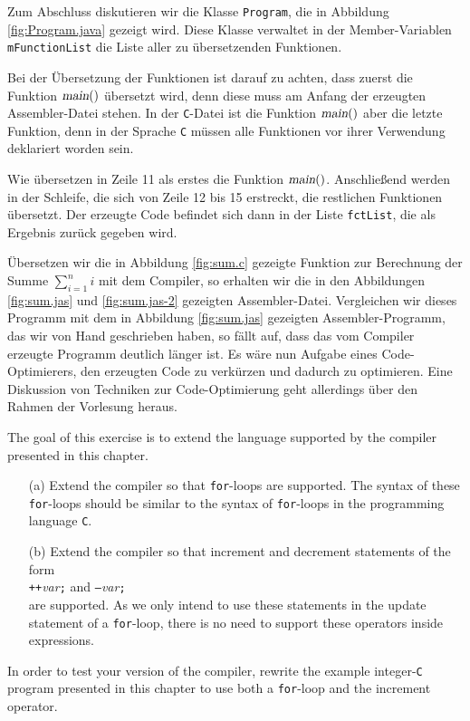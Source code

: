 \noindent
Zum Abschluss diskutieren wir die Klasse \texttt{Program}, die in Abbildung
\ref{fig:Program.java} gezeigt wird.  Diese Klasse verwaltet in der Member-Variablen
\texttt{mFunctionList} die Liste aller zu \"ubersetzenden Funktionen.  

Bei der \"Ubersetzung der Funktionen ist darauf zu achten, dass zuerst die Funktion $\textsl{main}()$
\"ubersetzt wird, denn diese muss am Anfang der erzeugten Assembler-Datei stehen.  In der
\texttt{C}-Datei ist die Funktion $\textsl{main}()$ aber die letzte Funktion, denn in der Sprache
\texttt{C} m\"ussen alle Funktionen vor ihrer Verwendung deklariert worden sein.

Wie \"ubersetzen in Zeile 11 als erstes die Funktion $\textsl{main}()$.  Anschlie{\ss}end werden in der
Schleife, die sich von Zeile 12 bis 15 erstreckt, die restlichen Funktionen \"ubersetzt.
Der erzeugte Code befindet sich dann in der Liste \texttt{fctList}, die als Ergebnis zur\"uck gegeben wird.  


\"Ubersetzen wir die in Abbildung
\ref{fig:sum.c} gezeigte Funktion zur Berechnung der Summe $\sum_{i=1}^n i$ mit dem Compiler, so
erhalten wir die in den Abbildungen \ref{fig:sum.jas} und \ref{fig:sum.jas-2} gezeigten
Assembler-Datei.  Vergleichen wir dieses Programm mit dem in Abbildung \ref{fig:sum.jas} gezeigten
Assembler-Programm, das wir von Hand geschrieben haben, so f\"allt auf, dass das vom Compiler erzeugte Programm 
deutlich l\"anger ist.  Es w\"are nun Aufgabe eines Code-Optimierers, den erzeugten Code zu verk\"urzen
und dadurch zu optimieren.  Eine Diskussion von Techniken zur Code-Optimierung geht allerdings \"uber
den Rahmen der Vorlesung heraus. 

\exerciseEng
The goal of this exercise is to extend the language supported by the compiler presented in this chapter.
\begin{enumerate}
\item[(a)] Extend the compiler so that \texttt{for}-loops are supported.  The syntax of these \texttt{for}-loops
           should be similar to the syntax of \texttt{for}-loops in the programming language \texttt{C}.
\item[(b)] Extend the compiler so that increment and decrement statements of the form
           \\[0.2cm]
           \hspace*{1.3cm}
           \texttt{++}\textsl{var}\texttt{;}  \quad and \quad
           \texttt{--}\textsl{var}\texttt{;}  
           \\[0.2cm]
           are supported.  As we only intend to use these statements in the update statement of a
           \texttt{for}-loop, there is no need to support these operators inside expressions. 
\end{enumerate}
In order to test your version of the compiler, rewrite the example integer-\texttt{C} program
presented in this chapter to use both a \texttt{for}-loop and the increment operator.  \eox

